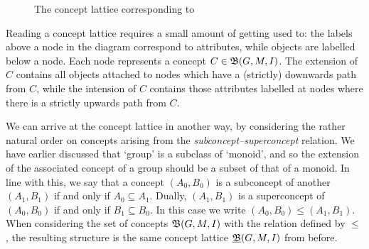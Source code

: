 \begin{figure}[H]
  \caption{The concept lattice corresponding to }
  \label{figure:concept-lattice-group-likes}
\end{figure}

\begin{remark}
  Reading a concept lattice requires a small amount of getting used to: the
  labels above a node in the diagram correspond to attributes, while objects are
  labelled below a node. Each node represents a concept $C \in {\mathfrak B} (G,M,\mathrel{I})$. The extension
  of $C$ contains all objects attached to nodes which have a (strictly) downwards
  path from $C$, while the intension of $C$ contains those attributes labelled
  at nodes where there is a strictly upwards path from $C$.
\end{remark}

We can arrive at the concept lattice in another way, by considering the rather
natural order on concepts arising from the \textit{subconcept--superconcept} relation.
We have earlier discussed that `group' is a subclass of `monoid', and so the extension
of the associated concept of a group should be a subset of that of a monoid. In
line with this, we say that a concept $(A_{0},B_{0})$ is a subconcept of another
$(A_{1},B_{1})$ if and only if $A_{0}\subseteq A_{1}$. Dually, $(A_{1},B_{1})$ is
a superconcept of $(A_{0},B_{0})$ if and only if $B_{1}\subseteq B_{0}$. In this
case we write $(A_{0},B_{0}) \leq (A_{1},B_{1})$. When considering the set of concepts
${\mathfrak B} (G,M,\mathrel{I})$ with the relation defined by $\leq$, the resulting structure is the same
concept lattice $\underline{{\mathfrak B}} (G,M,\mathrel{I})$ from before.

